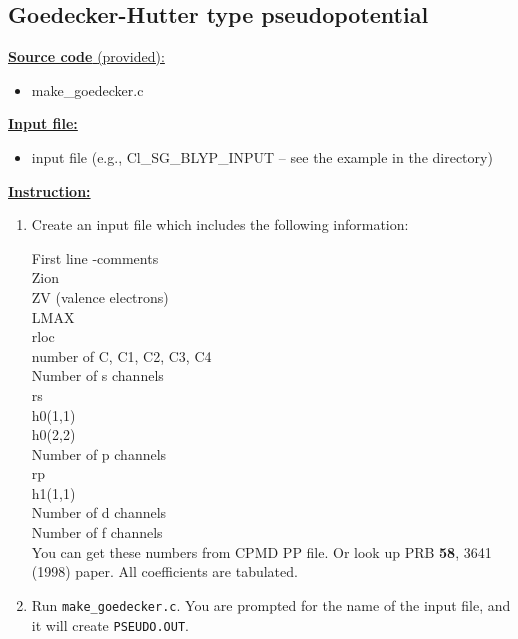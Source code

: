 \subsection{Goedecker-Hutter type pseudopotential}

\noindent
\underline{ {\bf Source code }(provided): }
	\begin{itemize}
	\item make\_goedecker.c
	\end{itemize}

\vskip 12pt
\noindent
\underline{ {\bf Input file:} }
	\begin{itemize}
	\item input file (e.g., Cl\_SG\_BLYP\_INPUT -- see the example in the directory)
	\end{itemize}
	
	
\vskip 12pt
\noindent
\underline{ {\bf Instruction:} }

\begin{enumerate}
\item Create an input file which includes the following information:

First line -comments\\
Zion\\
ZV (valence electrons)\\
LMAX\\
rloc\\
number of C, C1, C2, C3, C4\\
Number of s channels\\
rs\\
h0(1,1)\\
h0(2,2)\\
Number of p channels\\
rp\\
h1(1,1)\\
Number of d channels\\
Number of f channels\\

You can get these numbers from CPMD PP file. Or look up PRB \textbf{58}, 3641 (1998) paper. All coefficients are tabulated.

\item Run \verb+make_goedecker.c+. You are prompted for the name of the input file, and it will create \verb+PSEUDO.OUT+.


\end{enumerate}




%
